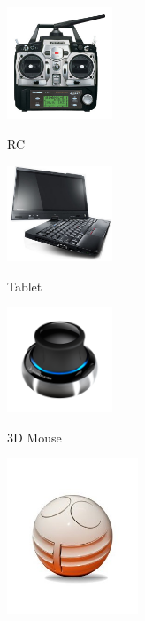 \begin{figure}[h]		
	\small{
		\begin{center}
			\parbox[b]{0.28\textwidth}{\includegraphics[width=0.28\textwidth]{futaba_7C_radio}
			\begin{center}RC \end{center}}
			\hspace{0.05\textwidth}
			\parbox[b]{0.28\textwidth}{\includegraphics[width=0.28\textwidth]{x220t_hero}
			\begin{center}Tablet \end{center}}
			\hspace{0.05 \textwidth}
			\parbox[b]{0.28\textwidth}{\includegraphics[width=0.28\textwidth]{3dx_productimage}
			\begin{center}3D Mouse \end{center}}			
			\vspace{0.05\textwidth}
			\hspace{0.05\textwidth}			
			\parbox[b]{0.35\textwidth}{\includegraphics[width=0.35\textwidth]{qgo_sphere_cut}
}
\end{center}}
\end{figure}
